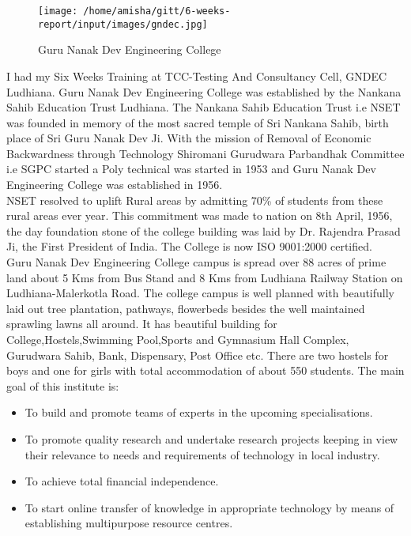 
\begin{figure}[ht]
\centering
\texttt{[image: /home/amisha/gitt/6-weeks-report/input/images/gndec.jpg]}
\caption{Guru Nanak Dev Engineering College}
\end{figure}
\hspace{-1.7em}
 I had my Six Weeks Training at TCC-Testing And Consultancy Cell, GNDEC Ludhiana. Guru Nanak Dev Engineering College was established by the Nankana Sahib Education Trust Ludhiana. The Nankana Sahib Education Trust i.e NSET
was founded in memory of the most sacred temple of Sri Nankana Sahib, birth place
of Sri Guru Nanak Dev Ji. With the mission of Removal of Economic Backwardness
through Technology Shiromani Gurudwara Parbandhak Committee i.e SGPC started a
Poly technical was started in 1953 and Guru Nanak Dev Engineering College was established in 1956.\\
NSET resolved to uplift Rural areas by admitting 70\% 
of students from these rural
areas ever year. This commitment was made to nation on 8th April, 1956, the day
foundation stone of the college building was laid by Dr. Rajendra Prasad Ji, the First
President of India. The College is now ISO 9001:2000 certified.\\
Guru Nanak Dev Engineering College campus is spread over 88 acres of prime land
about 5 Kms from Bus Stand and 8 Kms from Ludhiana Railway Station on Ludhiana-Malerkotla Road. The college campus is well planned with beautifully laid out tree plantation, pathways, flowerbeds besides the well maintained sprawling lawns all around. It
has beautiful building for College,Hostels,Swimming Pool,Sports and Gymnasium Hall
Complex, Gurudwara Sahib, Bank, Dispensary, Post Office etc. There are two hostels
for boys and one for girls with total accommodation of about 550 students. The main
goal of this institute is:\\
\begin{itemize}
\item To build and promote teams of experts in the upcoming specialisations.
\item To promote quality research and undertake research projects keeping in view their relevance to needs and requirements of technology in local industry.
\item To achieve total financial independence.
\item To start online transfer of knowledge in appropriate technology by means of establishing multipurpose resource centres.
\end{itemize}
